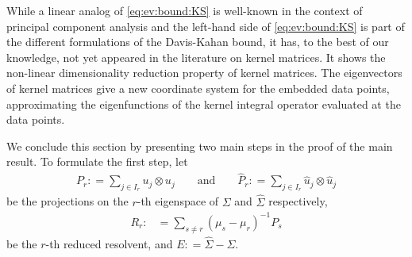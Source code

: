 \documentclass[a4paper,11pt]{article} %
\numberwithin{equation}{section}
\theoremstyle{definition}
\theoremstyle{remark}
\theoremstyle{plain}
\begin{document}
While a linear analog of \eqref{eq:ev:bound:KS} is well-known in the context of principal component analysis and the left-hand side of \eqref{eq:ev:bound:KS} is part of the different formulations of the Davis-Kahan bound, it has, to the best of our knowledge, not yet appeared in the literature on kernel matrices. It shows the non-linear dimensionality reduction property of kernel matrices. The eigenvectors of kernel matrices give a new coordinate system for the embedded data points, approximating the eigenfunctions of the kernel integral operator evaluated at the data points.

We conclude this section by presenting two  main steps in the proof of the main result. To formulate the first step, let 
\begin{align}
    P_{r}: = \sum_{j \in I_{r}}  u_{j} \otimes u_{j}\qquad \text{and}\qquad \widehat{P}_{r}: = \sum_{j \in I_{r}} \widehat{u}_{j} \otimes \widehat{u}_{j}
\end{align}
be the projections on the \( r \)-th eigenspace of \( \Sigma \) and \( \widehat{\Sigma} \) respectively, 
\begin{align}
  R_{r}: & = \sum_{s \ne r} (\mu_{s} - \mu_{r})^{-1} P_{s}
\end{align}
be the $r$-th reduced resolvent, and $ E: = \widehat{\Sigma} - \Sigma$.
\end{document}

